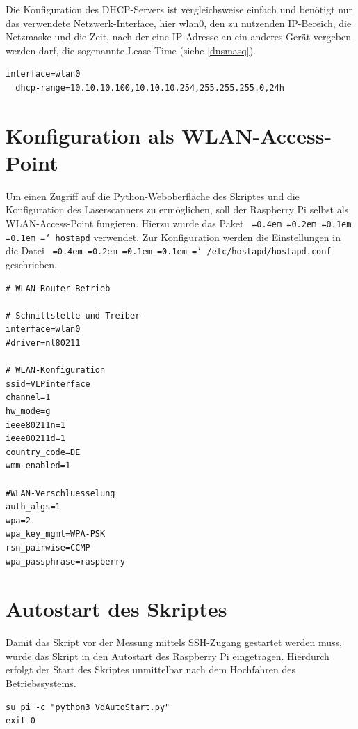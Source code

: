 \documentclass[a4paper,12pt,bibliography=totoc, listof=totoc,titlepage,pointlessnumbers]{scrreprt}
\newcommand*\justify{%
  \fontdimen2\font=0.4em%
  \fontdimen3\font=0.2em%
  \fontdimen4\font=0.1em%
  \fontdimen7\font=0.1em%
  \hyphenchar\font=`\-%
}
\newcommand{\code}[1]{\texttt{\justify{#1}}}
\begin{document}
Die Konfiguration des DHCP-Servers ist vergleichsweise einfach und benötigt nur das verwendete Netzwerk-Interface, hier wlan0, den zu nutzenden IP-Bereich, die Netzmaske und die Zeit, nach der eine IP-Adresse an ein anderes Gerät vergeben werden darf, die sogenannte Lease-Time (siehe \autoref{dnsmasq}). \cite{accesspoint}

  
\begin{lstlisting}[caption={Konfiguration der \code{/etc/dnsmasq.conf}}, label={dnsmasq}]
interface=wlan0
  dhcp-range=10.10.10.100,10.10.10.254,255.255.255.0,24h
\end{lstlisting}

\section{Konfiguration als WLAN-Access-Point}
Um einen Zugriff auf die Python-Weboberfläche des Skriptes und die Konfiguration des Laser\-scan\-ners zu ermöglichen, soll der Raspberry Pi selbst als WLAN-Access-Point fungieren. Hierzu wurde das Paket \code{hostapd} verwendet. Zur Konfiguration werden die Einstellungen in die Datei \code{/etc/hostapd/hostapd.conf} geschrieben. \cite{accesspoint}

\begin{lstlisting}[caption={Konfiguration der \code{/etc/hostapd/hostapd.conf}}, label={hostapd}]
# WLAN-Router-Betrieb

# Schnittstelle und Treiber
interface=wlan0
#driver=nl80211

# WLAN-Konfiguration
ssid=VLPinterface
channel=1
hw_mode=g
ieee80211n=1
ieee80211d=1
country_code=DE
wmm_enabled=1

#WLAN-Verschluesselung
auth_algs=1
wpa=2
wpa_key_mgmt=WPA-PSK
rsn_pairwise=CCMP
wpa_passphrase=raspberry
\end{lstlisting}

\section{Autostart des Skriptes}
Damit das Skript vor der Messung mittels SSH-Zugang gestartet werden muss, wurde das Skript in den Autostart des Raspberry Pi eingetragen. Hierdurch erfolgt der Start des Skriptes unmittelbar nach dem Hochfahren des Betriebssystems. 

\begin{lstlisting}[caption={Startskript startVLP.sh}, label={startskript}]
su pi -c "python3 VdAutoStart.py"
exit 0
\end{lstlisting}
\end{document}
